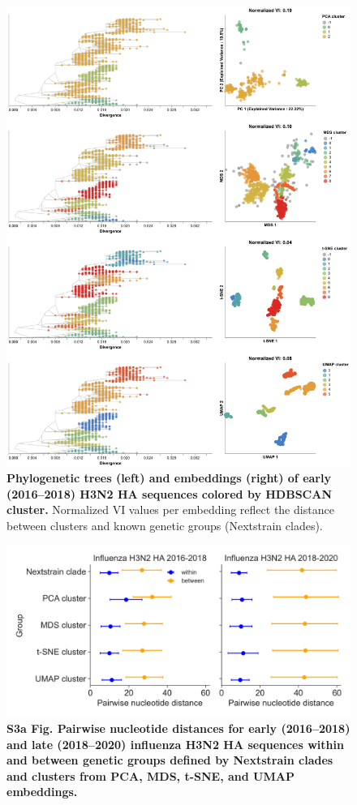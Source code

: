 \documentclass[10pt,letterpaper]{article}
\begin{document}
\begin{figure}[!h]
\includegraphics[width=\columnwidth]{figures/flu-2016-2018-ha-embeddings-by-cluster.png}
\caption{{\bf Phylogenetic trees (left) and embeddings (right) of early (2016--2018) H3N2 HA sequences colored by HDBSCAN cluster.}
Normalized VI values per embedding reflect the distance between clusters and known genetic groups (Nextstrain clades).}
\label{fig:seasonal-influenza-h3n2-ha-2016-2018-clusters}
\end{figure}

\begin{figure}[!h]
\includegraphics[width=\columnwidth]{figures/within_between_influenza.png}
\caption*{{\bf S3a Fig. Pairwise nucleotide distances for early (2016--2018) and late (2018--2020) influenza H3N2 HA sequences within and between genetic groups defined by Nextstrain clades and clusters from PCA, MDS, t-SNE, and UMAP embeddings.}}
\end{figure}
\end{document}
